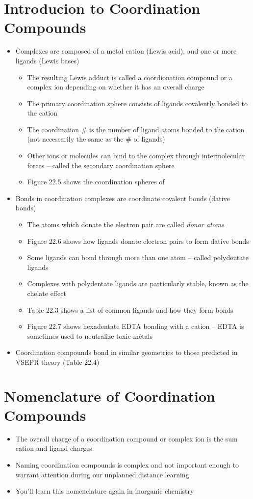 \documentclass[12pt, openany, letterpaper]{memoir}
\begin{document}
\section{Introducion to Coordination Compounds}
\begin{itemize}
	\item Complexes are composed of a metal cation (Lewis acid), and one or more ligands (Lewis bases)
	\begin{itemize}
		\item The resulting Lewis adduct is called a coordionation compound or a complex ion depending on whether it has an overall charge
		\item The primary coordination sphere consists of ligands covalently bonded to the cation
		\item The coordination \# is the number of ligand atoms bonded to the cation (not necessarily the same as the \# of ligands)
		\item Other ions or molecules can bind to the complex through intermolecular forces -- called the secondary coordination sphere
		\item Figure 22.5 shows the coordination spheres of 
	\end{itemize}
	\item Bonds in coordination complexes are coordinate covalent bonds (dative bonds)
	\begin{itemize}
		\item The atoms which donate the electron pair are called \emph{donor atoms}
		\item Figure 22.6 shows how ligands donate electron pairs to form dative bonds
		\item Some ligands can bond through more than one atom -- called polydentate ligands
		\item Complexes with polydentate ligands are particularly stable, known as the chelate effect
		\item Table 22.3 shows a list of common ligands and how they form bonds
		\item Figure 22.7 shows hexadentate EDTA bonding with a cation -- EDTA is sometimes used to neutralize toxic metals
	\end{itemize}
	\item Coordination compounds bond in similar geometries to those predicted in VSEPR theory (Table 22.4)
\end{itemize}
\section{Nomenclature of Coordination Compounds}
\begin{itemize}
	\item The overall charge of a coordination compound or complex ion is the sum cation and ligand charges
	\item Naming coordination compounds is complex and not important enough to warrant attention during our unplanned distance learning
	\item You'll learn this nomenclature again in inorganic chemistry
\end{itemize}
\end{document}
